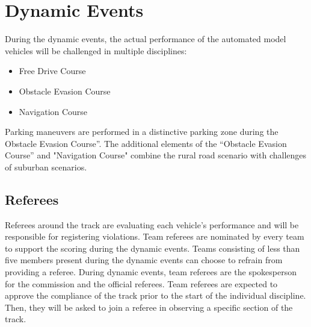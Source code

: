 \chapter{Dynamic Events}

\begin{highlight}
During the dynamic events, the actual performance of the automated model
vehicles will be challenged in multiple disciplines:
\begin{itemize}
    \item Free Drive Course
    \item Obstacle Evasion Course
    \item Navigation Course
\end{itemize}
Parking maneuvers are performed in a distinctive parking zone during the
Obstacle Evasion Course”. The additional elements of
the “Obstacle Evasion Course” and "Navigation Course" combine the rural road scenario with challenges
of suburban scenarios.
\end{highlight}

\section{Referees}

Referees around the track are evaluating each vehicle’s performance and will be
responsible for registering violations. Team referees are nominated by every
team to support the scoring during the dynamic events. Teams consisting of less
than five members present during the dynamic events can choose to refrain from
providing a referee. During dynamic events, team referees are the spokesperson
for the commission and the official referees. Team referees are expected to
approve the compliance of the track prior to the start of the individual
discipline. Then, they will be asked to join a referee in observing a specific
section of the track.



